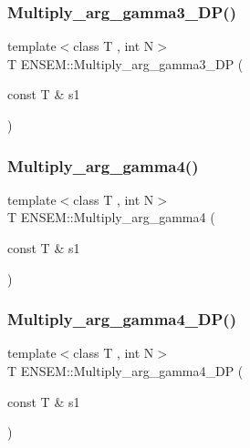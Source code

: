 \mbox{\label{namespaceENSEM_a1cd29e4091ddccc63172a39cb823d36a}} 
\subsubsection{\texorpdfstring{Multiply\_arg\_gamma3\_DP()}{Multiply\_arg\_gamma3\_DP()}}
{\footnotesize\ttfamily template$<$class T , int N$>$ \\
T E\+N\+S\+E\+M\+::\+Multiply\+\_\+arg\+\_\+gamma3\+\_\+\+DP (\begin{DoxyParamCaption}\item[{const T \&}]{s1 }\end{DoxyParamCaption})\hspace{0.3cm}{\ttfamily [inline]}}

\mbox{\label{namespaceENSEM_a85441f4376b87e5b81716bcda5cf3e6a}} 
\subsubsection{\texorpdfstring{Multiply\_arg\_gamma4()}{Multiply\_arg\_gamma4()}}
{\footnotesize\ttfamily template$<$class T , int N$>$ \\
T E\+N\+S\+E\+M\+::\+Multiply\+\_\+arg\+\_\+gamma4 (\begin{DoxyParamCaption}\item[{const T \&}]{s1 }\end{DoxyParamCaption})\hspace{0.3cm}{\ttfamily [inline]}}

\mbox{\label{namespaceENSEM_aab91417895cd5506b2fb592080159714}} 
\subsubsection{\texorpdfstring{Multiply\_arg\_gamma4\_DP()}{Multiply\_arg\_gamma4\_DP()}}
{\footnotesize\ttfamily template$<$class T , int N$>$ \\
T E\+N\+S\+E\+M\+::\+Multiply\+\_\+arg\+\_\+gamma4\+\_\+\+DP (\begin{DoxyParamCaption}\item[{const T \&}]{s1 }\end{DoxyParamCaption})\hspace{0.3cm}{\ttfamily [inline]}}

